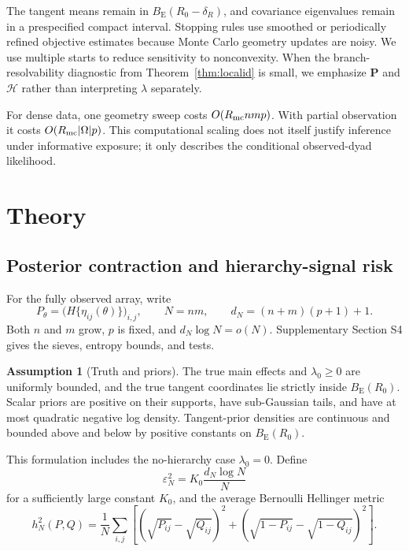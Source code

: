 \documentclass[
  12pt]{article}
\theoremstyle{definition}
\newtheorem{assumption}{Assumption}[section]
\theoremstyle{plain}
\newcommand{\bP}{\mathbf P}
\newcommand{\eps}{\varepsilon}
\begin{document}
The tangent means remain in $B_{\mathrm E}(R_0-\delta_R)$, and covariance eigenvalues remain in a prespecified compact interval. Stopping rules use smoothed or periodically refined objective estimates because Monte Carlo geometry updates are noisy. We use multiple starts to reduce sensitivity to nonconvexity. When the branch-resolvability diagnostic from Theorem~\ref{thm:localid} is small, we emphasize $\bP$ and $\mathcal H$ rather than interpreting $\lambda$ separately.

For dense data, one geometry sweep costs $O(R_{\rm mc}nmp)$. With partial observation it costs $O(R_{\rm mc}|\Omega|p)$. This computational scaling does not itself justify inference under informative exposure; it only describes the conditional observed-dyad likelihood.

\section{Theory}\label{sec:theory}

\subsection{Posterior contraction and hierarchy-signal risk}

For the fully observed array, write
\[
P_\theta=\bigl(H\{\eta_{ij}(\theta)\}\bigr)_{i,j},
\qquad N=nm,
\qquad d_N=(n+m)(p+1)+1.
\]
Both $n$ and $m$ grow, $p$ is fixed, and $d_N\log N=o(N)$. Supplementary Section S4 gives the sieves, entropy bounds, and tests.

\begin{assumption}[Truth and priors]
\label{ass:theory}
The true main effects and $\lambda_0\ge0$ are uniformly bounded, and the true tangent coordinates lie strictly inside $B_{\mathrm E}(R_0)$. Scalar priors are positive on their supports, have sub-Gaussian tails, and have at most quadratic negative log density. Tangent-prior densities are continuous and bounded above and below by positive constants on $B_{\mathrm E}(R_0)$.
\end{assumption}

This formulation includes the no-hierarchy case $\lambda_0=0$. Define
\[
\eps_N^2=K_0\frac{d_N\log N}{N}
\]
for a sufficiently large constant $K_0$, and the average Bernoulli Hellinger metric
\[
h_N^2(P,Q)=\frac1N\sum_{i,j}
\left[(\sqrt{P_{ij}}-\sqrt{Q_{ij}})^2+
(\sqrt{1-P_{ij}}-\sqrt{1-Q_{ij}})^2\right].
\]
\end{document}
